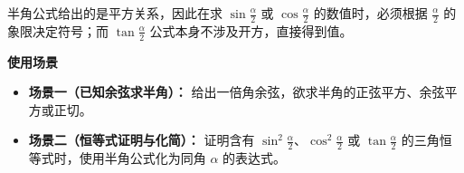 \begin{explanationbox}
	半角公式给出的是平方关系，因此在求 $\sin\frac{\alpha}{2}$ 或 $\cos\frac{\alpha}{2}$ 的数值时，必须根据 $\frac{\alpha}{2}$ 的象限决定符号；而 $\tan\frac{\alpha}{2}$ 公式本身不涉及开方，直接得到值。

	\medskip
	\textbf{\textcolor{CExplanation}{使用场景}}
	\begin{itemize}[leftmargin=*, itemsep=0.5em, topsep=0.4em]
		\item \textbf{场景一（已知余弦求半角）：} 给出一倍角余弦，欲求半角的正弦平方、余弦平方或正切。
		\item \textbf{场景二（恒等式证明与化简）：} 证明含有 $\sin^2\frac{\alpha}{2}$、$\cos^2\frac{\alpha}{2}$ 或 $\tan\frac{\alpha}{2}$ 的三角恒等式时，使用半角公式化为同角 $\alpha$ 的表达式。
	\end{itemize}
\end{explanationbox}
